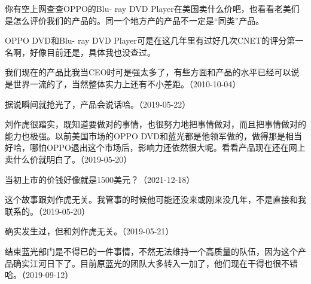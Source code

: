 
你有空上网查查OPPO的Blu- ray DVD Player在美国卖什么价吧，也看看老美们是怎么评价我们的产品的。同一个地方产的产品不一定是“同类”产品。

OPPO DVD和Blu- ray DVD Player可是在这几年里有过好几次CNET的评分第一名啊，好像目前还是，具体我也没查过。

我们现在的产品比我当CEO时可是强太多了，有些方面和产品的水平已经可以说是世界一流的了，当然整体实力上还有不小差距。（2010-10-04）


据说瞬间就抢光了，产品会说话哈。（2019-05-22）


刘作虎很踏实，既知道要做对的事情，也很努力地把事情做对，而且把事情做对的能力也极强。以前美国市场的OPPO DVD和蓝光都是他领军做的，做得那是相当好哈，哪怕OPPO退出这个市场后，影响力还依然很大呢。看看产品现在还在网上卖什么价就明白了。（2019-05-20）


当初上市的价钱好像就是1500美元？（2021-12-18）


这个故事跟刘作虎无关。我管事的时候他可能还没来或刚来没几年，不是直接和我联系的。（2019-05-20）


确实发生过，但和刘作虎无关。（2019-05-21）


结束蓝光部门是不得已的一件事情，不然无法维持一个高质量的队伍，因为这个产品确实江河日下了。目前原蓝光的团队大多转入一加了，他们现在干得也很不错哈。（2019-09-12）


